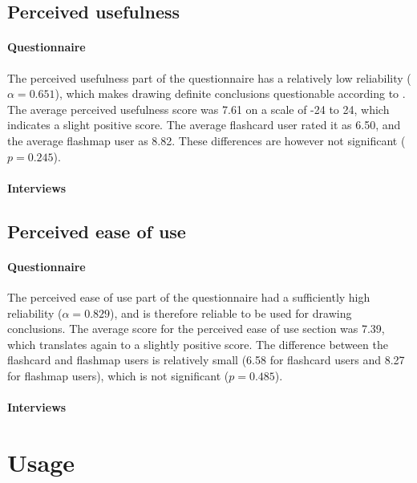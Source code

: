 \subsection{Perceived usefulness}

\paragraph{Questionnaire} The perceived usefulness part of the questionnaire has a relatively low reliability ($\alpha=0.651$), which makes drawing definite conclusions questionable according to . The average perceived usefulness score was 7.61 on a scale of -24 to 24, which indicates a slight positive score. The average flashcard user rated it as 6.50, and the average flashmap user as 8.82. These differences are however not significant ($p=0.245$).

\paragraph{Interviews}

\subsection{Perceived ease of use}

\paragraph{Questionnaire} The perceived ease of use part of the questionnaire had a sufficiently high reliability ($\alpha=0.829$), and is therefore reliable to be used for drawing conclusions. The average score for the perceived ease of use section was 7.39, which translates again to a slightly positive score. The difference between the flashcard and flashmap users is relatively small (6.58 for flashcard users and 8.27 for flashmap users), which is not significant ($p=0.485$).

\paragraph{Interviews}

\section{Usage}
